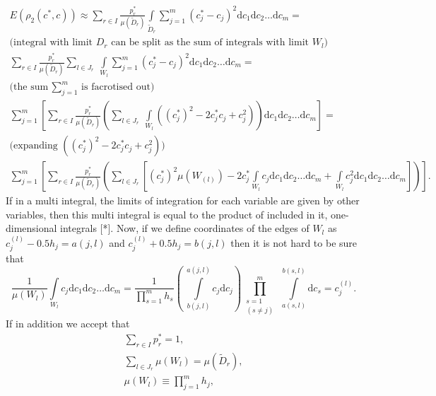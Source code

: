 \documentclass[11pt,a4paper]{article}
\numberwithin{equation}{subsection}
\begin{document}
\begin{gather}
\nonumber
E(\rho_{2}(c^{*},c)) \approx \sum\limits_{r \in I} \frac{p_{r}^{*}}{\mu(\tilde{D}_{r})} \int\limits_{\tilde{D}_{r}} \sum\limits_{j=1}^{m}(c_{j}^{*}-c_{j})^{2}\mathrm{d}c_{1}\mathrm{d}c_{2}\dots \mathrm{d}c_{m} = \\
\nonumber 
\text{(integral with limit } D_{r} \text{ can be split as the sum of integrals with limit } W_{l} \text{)}\\
\sum\limits_{r \in I} \frac{p_{r}^{*}}{\mu(\tilde{D}_{r})} \sum\limits_{l \in J_{r}} \  \int\limits_{W_{l}} \sum\limits_{j=1}^{m}(c_{j}^{*}-c_{j})^{2}\mathrm{d}c_{1}\mathrm{d}c_{2}\dots \mathrm{d}c_{m} = \\
\nonumber
\text{(the sum } \sum_{j=1}^{m} \text{ is facrotised out)} \\
\nonumber
\sum\limits_{j=1}^{m}  \left[ \sum\limits_{r \in I} \frac{p_{r}^{*}}{\mu(\tilde{D}_{r})} \left( \sum\limits_{l \in J_{r}} \ \int\limits_{W_{l}} ((c_{j}^{*})^{2}-2c_{j}^{*}c_{j}+c_{j}^{2}) \right) \mathrm{d}c_{1}\mathrm{d}c_{2}\dots \mathrm{d}c_{m} \right] = \\
\nonumber
\text{(expanding } ((c_{j}^{*})^{2}-2c_{j}^{*}c_{j}+c_{j}^{2}) \text{)}\\
\sum\limits_{j=1}^{m}  \left[ \sum\limits_{r \in I} \frac{p_{r}^{*}}{\mu(\tilde{D}_{r})} \left( \sum\limits_{l \in J_{r}} \left[ (c_{j}^{*})^{2} \mu(W_{(l)}) - 2c_{j}^{*} \int\limits_{W_{l}} c_{j} \mathrm{d}c_{1}\mathrm{d}c_{2}\dots \mathrm{d}c_{m} + \int\limits_{W_{l}} c_{j}^{2} \mathrm{d}c_{1}\mathrm{d}c_{2}\dots \mathrm{d}c_{m} \right] \right) \right]. \label{eq-simplification-chain}
\end{gather}
If in a multi integral, the limits of integration for each variable are given by other variables, then this multi integral is equal to the product of included in it, one-dimensional integrals [*]. Now, if we define coordinates of the edges of $W_{l}$ as $c_{j}^{(l)} - 0.5h_{j} = a(j,l)$ and $c_{j}^{(l)} + 0.5h_{j} = b(j,l)$ then it is not hard to be sure that 
\begin{equation}
\frac{1}{\mu(W_{l})} \int\limits_{W_l} c_{j} \mathrm{d} c_{1} \mathrm{d} c_{2} \ldots  \mathrm{d} c_{m} 
	= \dfrac{1}{\prod\limits_{s=1}^{m}h_{s}}
	\left( \  \int\limits_{b(j,l)}^{a(j,l)} c_{j}  \mathrm{d} c_{j}\right) 
	\prod_{\substack{s=1\\ (s\ne j)}}^m \ 
	\int\limits_{a(s,l)}^{b(s,l)} \!  \mathrm{d} c_{s} 
	= c_{j}^{(l)}.
\end{equation}
If in addition we accept that
\begin{gather}
\sum\limits_{r \in I} p_{r}^{*} =1, \\
\sum\limits_{l \in J_{r}} \mu(W_{l}) =\mu(\tilde{D}_{r}), \\
\mu(W_{l}) \equiv \prod\limits_{j=1}^{m}h_{j},
\end{gather}
\end{document}
